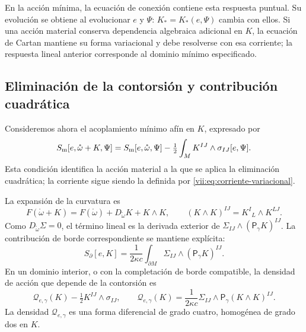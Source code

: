 En la acción mínima, la ecuación de conexión contiene esta respuesta
puntual. Su evolución se obtiene al evolucionar \(e\) y \(\Psi\):
\(K_*=K_*(e,\Psi)\) cambia con ellos. Si una acción material conserva
dependencia algebraica adicional en \(K\), la ecuación de Cartan
mantiene su forma variacional y debe resolverse con esa corriente;
la respuesta lineal anterior corresponde al dominio mínimo especificado.

\subsection{Eliminación de la contorsión y contribución cuadrática}
\label{vii:subsec:respuesta-cuadratica}

Consideremos ahora el acoplamiento mínimo afín en \(K\), expresado por
\begin{equation}
 S_{\rm m}[e,\mathring\omega+K,\Psi]
 =S_{\rm m}[e,\mathring\omega,\Psi]
   -\tfrac12\int_M K^{IJ}\wedge\sigma_{IJ}[e,\Psi].
 \label{vii:eq:materia-afin-contorsion}
\end{equation}
Esta condición identifica la acción material a la que se aplica la
eliminación cuadrática; la corriente sigue siendo la definida por
\eqref{vii:eq:corriente-variacional}.

La expansión de la curvatura es
\begin{equation}
 F(\mathring\omega+K)
 =F(\mathring\omega)+D_{\mathring\omega}K+K\wedge K,
 \qquad (K\wedge K)^{IJ}=K^I{}_{L}\wedge K^{LJ}.
 \label{vii:eq:curvatura-contorsion}
\end{equation}
Como \(D_{\mathring\omega}\Sigma=0\), el término lineal es la
derivada exterior de \(\Sigma_{IJ}\wedge(\mathsf P_\gamma K)^{IJ}\).
La contribución de borde correspondiente se mantiene explícita:
\begin{equation}
 S_\partial[e,K]=\frac1{2\kappa c}
     \int_{\partial M}\Sigma_{IJ}\wedge(\mathsf P_\gamma K)^{IJ}.
 \label{vii:eq:borde-contorsion}
\end{equation}
En un dominio interior, o con la completación de borde compatible,
la densidad de acción que depende de la contorsión es
\begin{equation}
 \mathcal Q_{e,\gamma}(K)-\tfrac12K^{IJ}\wedge\sigma_{IJ},
 \qquad
 \mathcal Q_{e,\gamma}(K)
  =\frac1{2\kappa c}\Sigma_{IJ}\wedge
                         \mathsf P_\gamma(K\wedge K)^{IJ}.
 \label{vii:eq:forma-cuadratica-contorsion}
\end{equation}
La densidad \(\mathcal Q_{e,\gamma}\) es una forma diferencial de
grado cuatro, homogénea de grado dos en \(K\).

